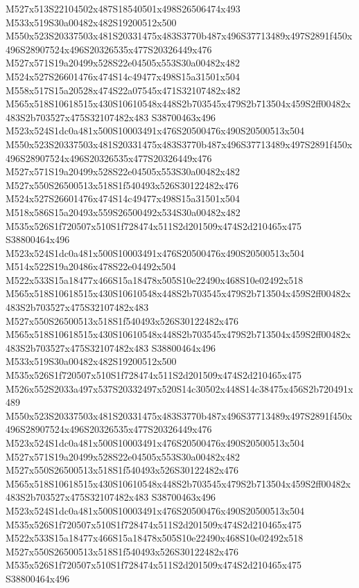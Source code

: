 \documentclass{article}
\begin{document}
\begin{multicols}{2}


M527x513S22104502x487S18540501x498S26506474x493 M533x519S30a00482x482S19200512x500 M550x523S20337503x481S20331475x483S3770b487x496S37713489x497S2891f450x496S28907524x496S20326535x477S20326449x476 M527x571S19a20499x528S22e04505x553S30a00482x482 M524x527S26601476x474S14c49477x498S15a31501x504 M558x517S15a20528x474S22a07545x471S32107482x482 M565x518S10618515x430S10610548x448S2b703545x479S2b713504x459S2ff00482x483S2b703527x475S32107482x483 S38700463x496 M523x524S1dc0a481x500S10003491x476S20500476x490S20500513x504 M550x523S20337503x481S20331475x483S3770b487x496S37713489x497S2891f450x496S28907524x496S20326535x477S20326449x476 M527x571S19a20499x528S22e04505x553S30a00482x482 M527x550S26500513x518S1f540493x526S30122482x476 M524x527S26601476x474S14c49477x498S15a31501x504 M518x586S15a20493x559S26500492x534S30a00482x482 M535x526S1f720507x510S1f728474x511S2d201509x474S2d210465x475 S38800464x496 M523x524S1dc0a481x500S10003491x476S20500476x490S20500513x504 M514x522S19a20486x478S22e04492x504 M522x533S15a18477x466S15a18478x505S10e22490x468S10e02492x518 M565x518S10618515x430S10610548x448S2b703545x479S2b713504x459S2ff00482x483S2b703527x475S32107482x483 M527x550S26500513x518S1f540493x526S30122482x476 M565x518S10618515x430S10610548x448S2b703545x479S2b713504x459S2ff00482x483S2b703527x475S32107482x483 S38800464x496 M533x519S30a00482x482S19200512x500 M535x526S1f720507x510S1f728474x511S2d201509x474S2d210465x475 M526x552S2033a497x537S20332497x520S14c30502x448S14c38475x456S2b720491x489 M550x523S20337503x481S20331475x483S3770b487x496S37713489x497S2891f450x496S28907524x496S20326535x477S20326449x476 M523x524S1dc0a481x500S10003491x476S20500476x490S20500513x504 M527x571S19a20499x528S22e04505x553S30a00482x482 M527x550S26500513x518S1f540493x526S30122482x476 M565x518S10618515x430S10610548x448S2b703545x479S2b713504x459S2ff00482x483S2b703527x475S32107482x483 S38700463x496 M523x524S1dc0a481x500S10003491x476S20500476x490S20500513x504 M535x526S1f720507x510S1f728474x511S2d201509x474S2d210465x475 M522x533S15a18477x466S15a18478x505S10e22490x468S10e02492x518 M527x550S26500513x518S1f540493x526S30122482x476 M535x526S1f720507x510S1f728474x511S2d201509x474S2d210465x475 S38800464x496


\end{multicols}
\end{document}
